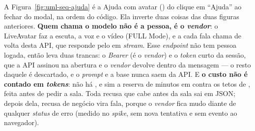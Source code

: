 A Figura~\ref{fig:uml-seq-ajuda} é a Ajuda com avatar () do clique
em \enquote{Ajuda} ao fechar do modal, na ordem do código. Ela inverte duas coisas
das duas figuras anteriores. \textbf{Quem chama o modelo não é a pessoa, é o
\emph{vendor}}: o LiveAvatar faz a escuta, a voz e o vídeo (FULL Mode), e a cada fala
chama de volta  desta API, que responde pelo
 em \emph{stream}. Esse \emph{endpoint} não tem pessoa logada, então
leva duas trancas: o \emph{Bearer}  (é o \emph{vendor}) e o
\emph{token} curto da sessão, que a API assinou na abertura e o \emph{vendor} devolve
dentro da mensagem  --- o resto daquele  é descartado, e o
\emph{prompt} e a base nunca saem da API. E \textbf{o custo não é contado em
\emph{tokens}}: não há , e sim a reserva de minutos em
 contra os tetos de , feita antes de pedir a
sala. Toda recusa que cabe antes da sala sai em JSON; depois dela, recusa de
negócio vira fala, porque o \emph{vendor} fica mudo diante de qualquer \emph{status}
de erro (medido no \emph{spike}, sem nova tentativa e sem evento ao navegador).

